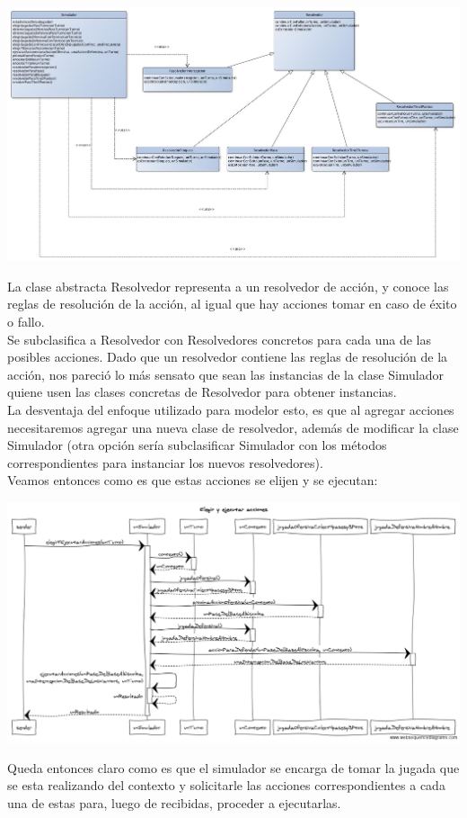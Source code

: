 \begin{center}
\includegraphics[scale=0.35, angle=90]{diseno/simuladorYResolvedor.jpg}
\end{center}

La clase abstracta Resolvedor representa a un resolvedor de acción, y conoce las reglas de resolución de la acción, al igual que hay acciones tomar en caso de éxito o fallo.\\
Se subclasifica a Resolvedor con Resolvedores concretos para cada una de las posibles acciones.
Dado que un resolvedor contiene las reglas de resolución de la acción, nos pareció lo más sensato que sean las instancias de la clase Simulador quiene usen las clases concretas de Resolvedor para obtener instancias.\\

La desventaja del enfoque utilizado para modelor esto, es que al agregar acciones necesitaremos agregar una nueva clase de resolvedor, además de modificar la clase Simulador (otra opción sería subclasificar Simulador con los métodos correspondientes para instanciar los nuevos resolvedores).\\


Veamos entonces como es que estas acciones se elijen y se ejecutan:
\begin{center}
\includegraphics[scale=0.35]{diseno/Elegir_y_ejecutar_acciones.png}
\end{center}
Queda entonces claro como es que el simulador se encarga de tomar la jugada que se esta realizando del contexto y solicitarle las acciones correspondientes a cada una de estas para, luego de recibidas, proceder a ejecutarlas.

